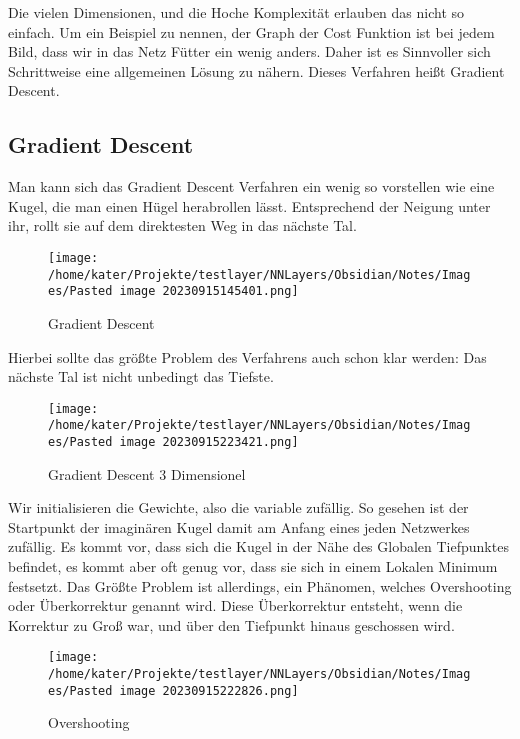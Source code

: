 \documentclass[12pt]{article}
\begin{document}
Die vielen Dimensionen, und die Hoche Komplexität erlauben das nicht so einfach. Um ein Beispiel zu nennen, der Graph der Cost Funktion ist bei jedem Bild, dass wir in das Netz Fütter ein wenig anders. Daher ist es Sinnvoller sich Schrittweise eine allgemeinen Lösung zu nähern. Dieses Verfahren heißt Gradient Descent. \subsection{ Gradient Descent}Man kann sich das Gradient Descent Verfahren ein wenig so vorstellen wie eine Kugel, die man einen Hügel herabrollen lässt. Entsprechend der Neigung unter ihr, rollt sie auf dem direktesten Weg in das nächste Tal. 
\begin{figure}[H]
\centering
\texttt{[image: /home/kater/Projekte/testlayer/NNLayers/Obsidian/Notes/Images/Pasted image 20230915145401.png]}
\caption{Gradient Descent}
\label{Was kommt hier rein?}
\end{figure}
Hierbei sollte das größte Problem des Verfahrens auch schon klar werden: Das nächste Tal ist nicht unbedingt das Tiefste.
\begin{figure}[H]
\centering
\texttt{[image: /home/kater/Projekte/testlayer/NNLayers/Obsidian/Notes/Images/Pasted image 20230915223421.png]}
\caption{Gradient Descent 3 Dimensionel}
\label{Was kommt hier rein?}
\end{figure}
Wir initialisieren die Gewichte, also die variable zufällig. So gesehen ist der Startpunkt der imaginären Kugel damit am Anfang eines jeden Netzwerkes zufällig. Es kommt vor, dass sich die Kugel in der Nähe des Globalen Tiefpunktes befindet, es kommt aber oft genug vor, dass sie sich in einem Lokalen Minimum festsetzt. 
Das Größte Problem ist allerdings, ein Phänomen, welches Overshooting oder Überkorrektur genannt wird. Diese Überkorrektur entsteht, wenn die Korrektur zu Groß war, und über den Tiefpunkt hinaus geschossen wird.
\begin{figure}[H]
\centering
\texttt{[image: /home/kater/Projekte/testlayer/NNLayers/Obsidian/Notes/Images/Pasted image 20230915222826.png]}
\caption{Overshooting}
\label{Was kommt hier rein?}
\end{figure}
\end{document}
